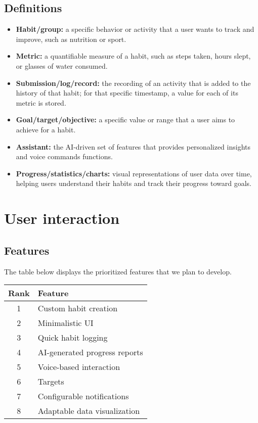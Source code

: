 \documentclass{article}
\begin{document}
\subsection{Definitions}

\begin{itemize}
    \item \textbf{Habit/group:} a specific behavior or activity that a user wants to track and improve, such as nutrition or sport.
    \item \textbf{Metric:} a quantifiable measure of a habit, such as steps taken, hours slept, or glasses of water consumed.
    \item \textbf{Submission/log/record:} the recording of an activity that is added to the history of that habit; for that specific timestamp, a value for each of its metric is stored.
    \item \textbf{Goal/target/objective:} a specific value or range that a user aims to achieve for a habit.
    \item \textbf{Assistant:} the AI-driven set of features that provides personalized insights and voice commands functions.
    \item \textbf{Progress/statistics/charts:} visual representations of user data over time, helping users understand their habits and track their progress toward goals.
\end{itemize}

\newpage
\section{User interaction}

\subsection{Features}

The table below displays the prioritized features that we plan to develop.

\begin{table}[H]
    \centering
    \begin{tabularx}{0.5\textwidth}{c|X}
        \hline
        \textbf{Rank} & \textbf{Feature} \\
        \hline
        1 & Custom habit creation \\
        2 & Minimalistic UI \\
        3 & Quick habit logging  \\
        4 & AI-generated progress reports  \\
        5 & Voice-based interaction  \\
        6 & Targets \\
        7 & Configurable notifications  \\
        8 & Adaptable data visualization \\
        \hline
    \end{tabularx}
\end{table}
\end{document}
